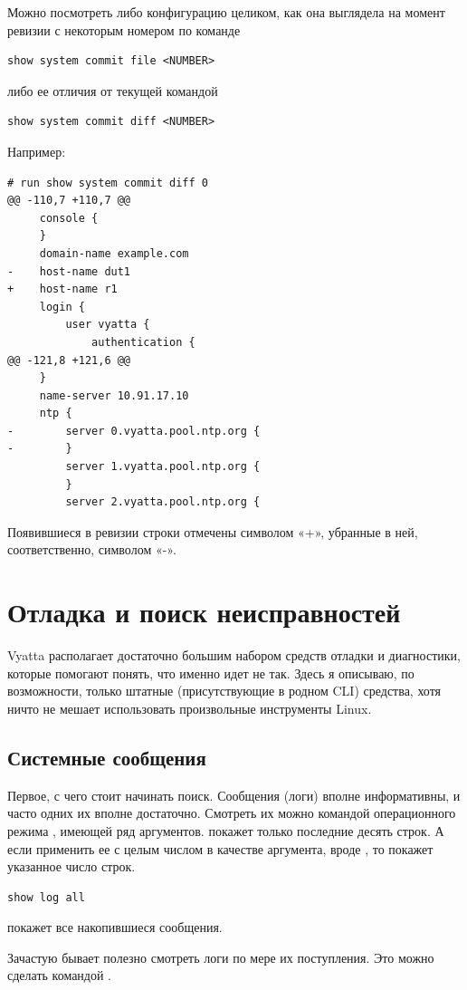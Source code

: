\documentclass[a4paper,12pt, twoside, russian]{report}
\begin{document}
Можно посмотреть либо конфигурацию целиком, как она выглядела на момент ревизии с некоторым номером по
команде \begin{verbatim}show system commit file <NUMBER>\end{verbatim} либо ее отличия от текущей командой 
\begin{verbatim}show system commit diff <NUMBER>\end{verbatim} Например:
\begin{verbatim}
# run show system commit diff 0
@@ -110,7 +110,7 @@
     console {
     }
     domain-name example.com
-    host-name dut1
+    host-name r1
     login {
         user vyatta {
             authentication {
@@ -121,8 +121,6 @@
     }
     name-server 10.91.17.10
     ntp {
-        server 0.vyatta.pool.ntp.org {
-        }
         server 1.vyatta.pool.ntp.org {
         }
         server 2.vyatta.pool.ntp.org {
\end{verbatim}
Появившиеся в ревизии строки отмечены символом «+», убранные в ней, соответственно, символом «-». 

\chapter{Отладка и поиск неисправностей}

Vyatta располагает достаточно большим набором средств отладки и диагностики, которые помогают понять, 
что именно идет не так. Здесь я описываю, по возможности, только штатные (присутствующие в родном CLI) 
средства, хотя ничто не мешает использовать произвольные инструменты Linux. 

\section{Системные сообщения}

Первое, с чего стоит начинать поиск. Сообщения (логи) вполне информативны, и часто одних их вполне достаточно.
Смотреть их можно командой операционного режима , имеющей ряд аргументов. 
 покажет только последние десять строк. А если применить ее
с целым числом в качестве аргумента, вроде , то покажет указанное число строк.
\begin{verbatim}show log all\end{verbatim} покажет все накопившиеся сообщения.

Зачастую бывает полезно смотреть логи по мере их поступления. Это можно сделать командой .
\end{document}
